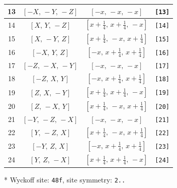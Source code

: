 \documentclass[fleqn,8pt]{jsarticle}
\begin{document}
\begin{longtable}{cccc}
13 & $\left[ - X,\, - Y,\, - Z \right]$ & $\left[ - x,\, - x,\, - x \right]$ & {\tt [13]} \\ \hline
14 & $\left[ X,\, Y,\, - Z \right]$ & $\left[ x + \frac{1}{4},\, x + \frac{1}{4},\, - x \right]$ & {\tt [14]} \\ \hline
15 & $\left[ X,\, - Y,\, Z \right]$ & $\left[ x + \frac{1}{4},\, - x,\, x + \frac{1}{4} \right]$ & {\tt [15]} \\ \hline
16 & $\left[ - X,\, Y,\, Z \right]$ & $\left[ - x,\, x + \frac{1}{4},\, x + \frac{1}{4} \right]$ & {\tt [16]} \\ \hline
17 & $\left[ - Z,\, - X,\, - Y \right]$ & $\left[ - x,\, - x,\, - x \right]$ & {\tt [17]} \\ \hline
18 & $\left[ - Z,\, X,\, Y \right]$ & $\left[ - x,\, x + \frac{1}{4},\, x + \frac{1}{4} \right]$ & {\tt [18]} \\ \hline
19 & $\left[ Z,\, X,\, - Y \right]$ & $\left[ x + \frac{1}{4},\, x + \frac{1}{4},\, - x \right]$ & {\tt [19]} \\ \hline
20 & $\left[ Z,\, - X,\, Y \right]$ & $\left[ x + \frac{1}{4},\, - x,\, x + \frac{1}{4} \right]$ & {\tt [20]} \\ \hline
21 & $\left[ - Y,\, - Z,\, - X \right]$ & $\left[ - x,\, - x,\, - x \right]$ & {\tt [21]} \\ \hline
22 & $\left[ Y,\, - Z,\, X \right]$ & $\left[ x + \frac{1}{4},\, - x,\, x + \frac{1}{4} \right]$ & {\tt [22]} \\ \hline
23 & $\left[ - Y,\, Z,\, X \right]$ & $\left[ - x,\, x + \frac{1}{4},\, x + \frac{1}{4} \right]$ & {\tt [23]} \\ \hline
24 & $\left[ Y,\, Z,\, - X \right]$ & $\left[ x + \frac{1}{4},\, x + \frac{1}{4},\, - x \right]$ & {\tt [24]} \\
\end{longtable}
* Wyckoff site: {\tt 48f}, site symmetry: {\tt 2..}
\renewcommand{\arraystretch}{1.2}
\end{document}
